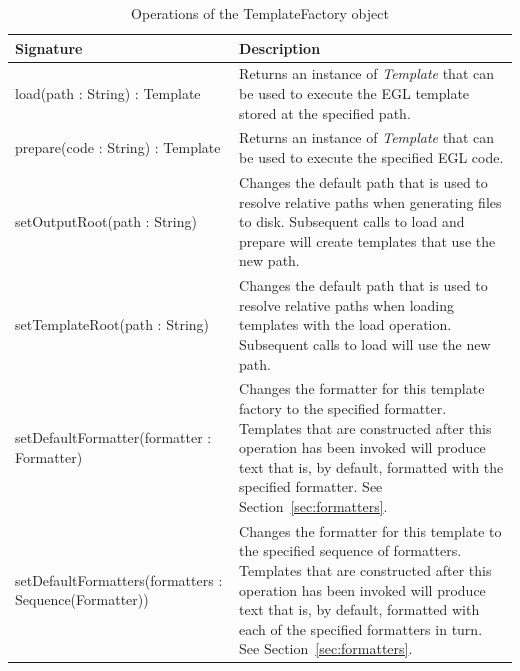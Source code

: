 \label{sec:template_factory}
\begin{longtabu} {|p{5.5cm}|X|}
			
			\caption{Operations of the TemplateFactory object}
			\label{tab:TemplateFactoryOperations}\\
			
			\hline
							
			\textbf{Signature} & \textbf{Description} \\\hline
			
			load(path : String) : Template & Returns an instance of \emph{Template} that can be used to execute the EGL template stored at the specified path.  \\\hline
			
			prepare(code : String) : Template & Returns an instance of \emph{Template} that can be used to execute the specified EGL code.  \\\hline
			
			setOutputRoot(path : String) & Changes the default path that is used to resolve relative paths when generating files to disk. Subsequent calls to load and prepare will create templates that use the new path. \\\hline
			
			setTemplateRoot(path : String) & Changes the default path that is used to resolve relative paths when loading templates with the load operation. Subsequent calls to load will use the new path. \\\hline
			
			setDefaultFormatter(formatter : Formatter) & Changes the formatter for this template factory to the specified formatter. Templates that are constructed after this
operation has been invoked will produce text that is, by default, formatted with the specified formatter. See Section~\ref{sec:formatters}. \\\hline
			
			setDefaultFormatters(fo\-rm\-at\-te\-rs : Sequence(Formatter)) & Changes the formatter for this template to the specified sequence of formatters. Templates that are constructed after this operation has been invoked will produce text that is, by default, formatted with each of the specified formatters in turn. See Section~\ref{sec:formatters}.  \\\hline
\end{longtabu}

